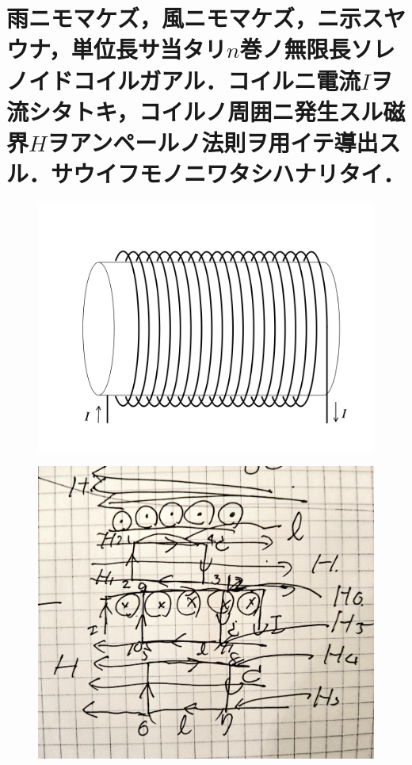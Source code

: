 \documentclass[dvipdfmx]{ujarticle}
\begin{document}
\newpage
\section{雨ニモマケズ，風ニモマケズ，ニ示スヤウナ，単位長サ当タリ$n$巻ノ無限長ソレノイドコイルガアル．コイルニ電流$I$ヲ流シタトキ，コイルノ周囲ニ発生スル磁界$H$ヲアンペールノ法則ヲ用イテ導出スル．サウイフモノニワタシハナリタイ．}

\begin{figure}[h]
	\centering
	\includegraphics[scale=0.35]{./fig/R03_fig2.png}
	\caption{}
	\label{fig:2}
\end{figure}
\begin{figure}[h]
	\centering
	\includegraphics[scale=0.35]{./fig/fig.pdf}
	\caption{}
	\label{fig:a}
\end{figure}
\end{document}
